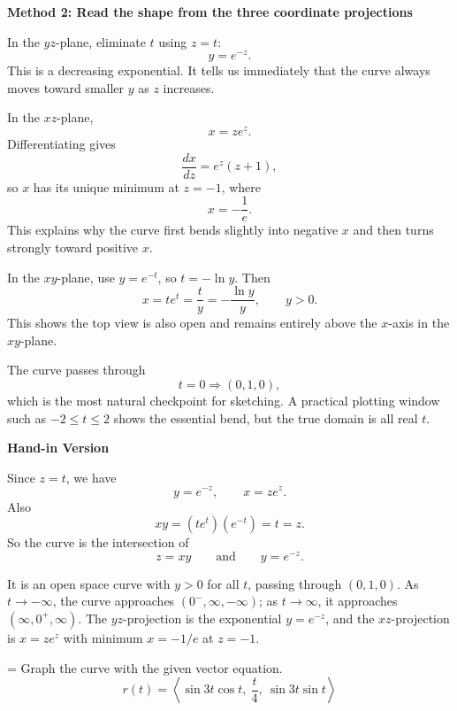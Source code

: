 \documentclass[a4paper,12pt,twocolumn]{article}
\newlength{\problemnumberwidth}
\newenvironment{solutionbox}{\begin{framed}}{\end{framed}}
\newcommand{\problem}[3]{%
  \Needspace{10\baselineskip}%
  \phantomsection\label{#1}%
  \par\vspace{0.8em}%
  \noindent
  \hangindent=\problemnumberwidth
  \hangafter=1
  \makebox[\problemnumberwidth][l]{\textbf{#2.}}#3\par
}
\begin{document}
\begin{solutionbox}
\textbf{Method 2: Read the shape from the three coordinate projections}

\begin{steps}
\item In the \(yz\)-plane, eliminate \(t\) using \(z=t\):
\[
y=e^{-z}.
\]
This is a decreasing exponential. It tells us immediately that the curve always moves toward smaller \(y\) as \(z\) increases.

\item In the \(xz\)-plane,
\[
x=ze^z.
\]
Differentiating gives
\[
\frac{dx}{dz}=e^z(z+1),
\]
so \(x\) has its unique minimum at \(z=-1\), where
\[
x=-\frac1e.
\]
This explains why the curve first bends slightly into negative \(x\) and then turns strongly toward positive \(x\).

\item In the \(xy\)-plane, use \(y=e^{-t}\), so \(t=-\ln y\). Then
\[
x=te^t=\frac{t}{y}=-\frac{\ln y}{y},\qquad y>0.
\]
This shows the top view is also open and remains entirely above the \(x\)-axis in the \(xy\)-plane.

\item The curve passes through
\[
t=0 \Rightarrow (0,1,0),
\]
which is the most natural checkpoint for sketching. A practical plotting window such as \(-2\le t\le 2\) shows the essential bend, but the true domain is all real \(t\).
\end{steps}
\end{solutionbox}

\begin{solutionbox}
\textbf{Hand-in Version}

Since \(z=t\), we have
\[
y=e^{-z},\qquad x=ze^z.
\]
Also
\[
xy=(te^t)(e^{-t})=t=z.
\]
So the curve is the intersection of
\[
\boxed{z=xy}
\qquad\text{and}\qquad
\boxed{y=e^{-z}.}
\]

It is an open space curve with \(y>0\) for all \(t\), passing through \((0,1,0)\). As \(t\to-\infty\), the curve approaches \((0^{-},\infty,-\infty)\); as \(t\to\infty\), it approaches \((\infty,0^{+},\infty)\). The \(yz\)-projection is the exponential \(y=e^{-z}\), and the \(xz\)-projection is \(x=ze^z\) with minimum \(x=-1/e\) at \(z=-1\).
\end{solutionbox}

\problem{prob:13-1-43}{43}{Graph the curve with the given vector equation.
\[
r(t)=\left\langle \sin 3t\cos t,\ \frac{t}{4},\ \sin 3t\sin t\right\rangle
\]}
\end{document}
